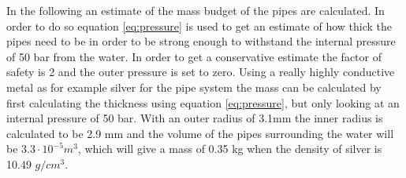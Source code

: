 \noindent 
In the following an estimate of the mass budget of the pipes are calculated. In order to do so equation \ref{eq:pressure} is used to get an estimate of how thick the pipes need to be in order to be strong enough to withstand the internal pressure of 50 bar from the water. In order to get a conservative estimate the factor of safety is 2 and the outer pressure is set to zero. Using a really highly conductive metal as for example silver for the pipe system the mass can be calculated by first calculating the thickness using equation \ref{eq:pressure}, but only looking at an internal pressure of 50 bar. With an outer radius of 3.1mm the inner radius is calculated to be 2.9 mm and the volume of the pipes surrounding the water will be $3.3 \cdot 10^{-5} m^3$, which will give a mass of 0.35 kg when the density of silver is 10.49 $g/cm^3$. 

